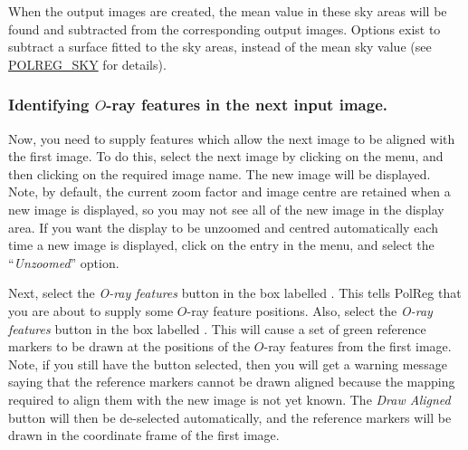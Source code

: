 When the output images are created, the mean value in these sky areas
will be found and subtracted from the corresponding output images. Options
exist to subtract a surface fitted to the sky areas, instead of the mean
sky value (see \hyperref{here}{section }{}{POLREG_SKY} for details).



\subsubsection {Identifying $O$-ray features in the next input image.}
Now, you need to supply features which allow the next image to be
aligned with the first image. To do this, select the next image by
clicking on the  menu, and then
clicking on the required image name. The new image will be displayed.
Note, by default, the current zoom factor and image centre are retained
when a new image is displayed, so you may not see all of the new image in
the display area. If you want the display to be unzoomed and centred
automatically each time a new image is displayed, click on the
 entry in the  menu, and select the ``{\em Unzoomed}'' option.

Next, select the {\em O-ray features} button in the box labelled
. This tells PolReg that you are
about to supply some $O$-ray feature positions. Also, select the 
{\em O-ray features} button in the box labelled
. This will cause
a set of green reference markers to be drawn at the positions of the
$O$-ray features from the first image. Note, if you still have the
 button selected, then
you will get a warning message saying that the reference markers cannot
be drawn aligned because the mapping required to align them with the new
image is not yet known. The {\em Draw Aligned} button will then be
de-selected automatically, and the reference markers will be drawn in the
coordinate frame of the first image.

